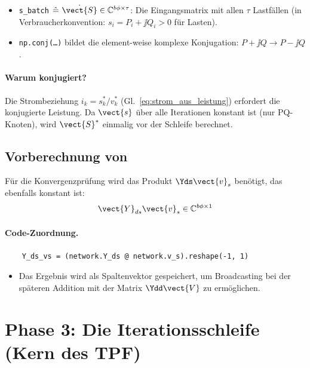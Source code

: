 \begin{itemize}
	\item \texttt{s\_batch} $\hat{=}\ \dot{\vect{S}} \in \mathbb{C}^{b\phi \times \tau}$: Die Eingangsmatrix mit allen $\tau$ Lastfällen (in Verbraucherkonvention: $s_i = P_i + \jj Q_i > 0$ für Lasten).
	\item \texttt{np.conj(\ldots)} bildet die element-weise komplexe Konjugation: $P + \jj Q \to P - \jj Q$.
\end{itemize}

\paragraph{Warum konjugiert?} Die Strombeziehung $i_k = s_k^*/v_k^*$ (Gl.~\eqref{eq:strom_aus_leistung}) erfordert die konjugierte Leistung. Da $\vect{s}$ über alle Iterationen konstant ist (nur PQ-Knoten), wird $\vect{S}^*$ einmalig vor der Schleife berechnet.

\subsection{Vorberechnung von}
\label{subsec:yds_vs}

Für die Konvergenzprüfung wird das Produkt $\Yds \vect{v}_s$ benötigt, das ebenfalls konstant ist:
\begin{equation}
	\vect{Y}_{ds} \vect{v}_s \in \mathbb{C}^{b\phi \times 1}
	\label{eq:yds_vs}
\end{equation}

\paragraph{Code-Zuordnung.}
\begin{verbatim}
	Y_ds_vs = (network.Y_ds @ network.v_s).reshape(-1, 1)
\end{verbatim}

\begin{itemize}
	\item Das Ergebnis wird als Spaltenvektor gespeichert, um Broadcasting bei der späteren Addition mit der Matrix $\Ydd \vect{V}$ zu ermöglichen.
\end{itemize}

\section{Phase 3: Die Iterationsschleife (Kern des TPF)}
\label{sec:iteration}

